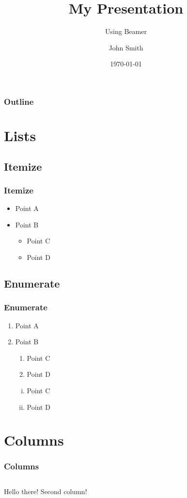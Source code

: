 \documentclass{beamer}
\title{My Presentation}
\subtitle{Using Beamer}
\author{John Smith}
\institute{University of the World}
\date{\today}
\begin{document}
\begin{frame}
\titlepage
\end{frame}

\begin{frame}
\frametitle{Outline}
\tableofcontents
\end{frame}

\section{Lists}
\subsection{Itemize}

\begin{frame}
\frametitle{Itemize}
\begin{itemize}
    \item Point A
    \item Point B
    \begin{itemize}
        \item Point C
        \item Point D
    \end{itemize}
\end{itemize}
\end{frame}

\subsection{Enumerate}

\begin{frame}
\frametitle{Enumerate}
\begin{enumerate}[I]
    \item Point A
    \item Point B
    \begin{enumerate}[i]
        \item Point C
        \item Point D
    \end{enumerate}
    \begin{enumerate}[(i)]
        \item Point C
        \item Point D
    \end{enumerate}
\end{enumerate}
\end{frame}

\section{Columns}
\begin{frame}
\frametitle{Columns}
    \begin{columns}
        Hello there!
        Second column!
    \end{columns}
\end{frame}
\end{document}

